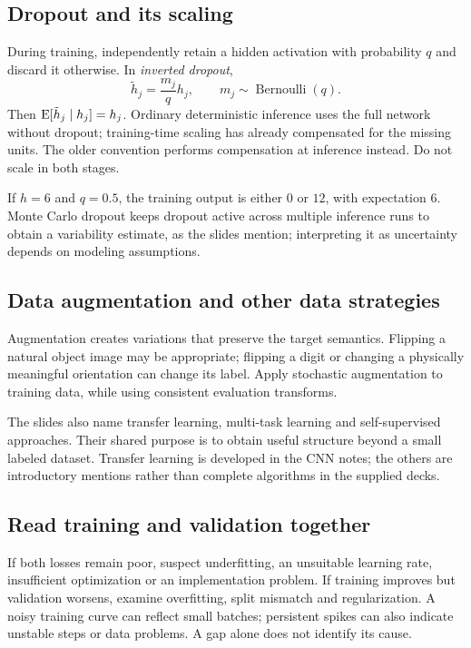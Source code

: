 \documentclass[11pt]{article}
\begin{document}
\subsection{Dropout and its scaling}
During training, independently retain a hidden activation with probability $q$ and discard it otherwise. In \emph{inverted dropout},
\[
\tilde h_j=\frac{m_j}{q}h_j,\qquad m_j\sim\operatorname{Bernoulli}(q).
\]
Then $\operatorname{E}[\tilde h_j\mid h_j]=h_j$. Ordinary deterministic inference uses the full network without dropout; training-time scaling has already compensated for the missing units. The older convention performs compensation at inference instead. Do not scale in both stages.

If $h=6$ and $q=0.5$, the training output is either $0$ or $12$, with expectation $6$. Monte Carlo dropout keeps dropout active across multiple inference runs to obtain a variability estimate, as the slides mention; interpreting it as uncertainty depends on modeling assumptions.
\subsection{Data augmentation and other data strategies}
Augmentation creates variations that preserve the target semantics. Flipping a natural object image may be appropriate; flipping a digit or changing a physically meaningful orientation can change its label. Apply stochastic augmentation to training data, while using consistent evaluation transforms.

The slides also name transfer learning, multi-task learning and self-supervised approaches. Their shared purpose is to obtain useful structure beyond a small labeled dataset. Transfer learning is developed in the CNN notes; the others are introductory mentions rather than complete algorithms in the supplied decks.
\subsection{Read training and validation together}
If both losses remain poor, suspect underfitting, an unsuitable learning rate, insufficient optimization or an implementation problem. If training improves but validation worsens, examine overfitting, split mismatch and regularization. A noisy training curve can reflect small batches; persistent spikes can also indicate unstable steps or data problems. A gap alone does not identify its cause.
\end{document}
